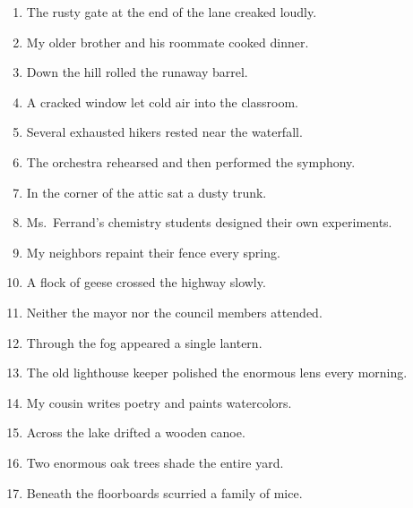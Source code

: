 \documentclass[11pt]{article}
\begin{document}
\begin{enumerate}
  \item The rusty gate at the end of the lane creaked loudly.
  \vspace{0.75in}
  \item My older brother and his roommate cooked dinner.
  \vspace{0.75in}
  \item Down the hill rolled the runaway barrel.
  \vspace{0.75in}
  \item A cracked window let cold air into the classroom.
  \vspace{0.75in}
  \item Several exhausted hikers rested near the waterfall.
  \vspace{0.75in}
  \item The orchestra rehearsed and then performed the symphony.
  \vspace{0.75in}
  \item In the corner of the attic sat a dusty trunk.
  \vspace{0.75in}
  \item Ms.\ Ferrand's chemistry students designed their own experiments.
  \vspace{0.75in}
  \item My neighbors repaint their fence every spring.
  \vspace{0.75in}
  \item A flock of geese crossed the highway slowly.
  \vspace{0.75in}
  \item Neither the mayor nor the council members attended.
  \vspace{0.75in}
  \item Through the fog appeared a single lantern.
  \vspace{0.75in}
  \item The old lighthouse keeper polished the enormous lens every morning.
  \vspace{0.75in}
  \item My cousin writes poetry and paints watercolors.
  \vspace{0.75in}
  \item Across the lake drifted a wooden canoe.
  \vspace{0.75in}
  \item Two enormous oak trees shade the entire yard.
  \vspace{0.75in}
  \item Beneath the floorboards scurried a family of mice.

\end{enumerate}
\end{document}
